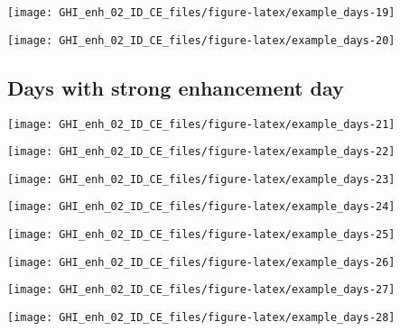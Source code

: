\documentclass[
  10pt,
  a4paper,oneside]{article}
\begin{document}
\begin{center}\texttt{[image: GHI\_enh\_02\_ID\_CE\_files/figure-latex/example\_days-19]} \end{center}

\begin{center}\texttt{[image: GHI\_enh\_02\_ID\_CE\_files/figure-latex/example\_days-20]} \end{center}

\FloatBarrier

\hypertarget{days-with-strong-enhancement-day}{%
\subsection{Days with strong enhancement day}\label{days-with-strong-enhancement-day}}

\begin{center}\texttt{[image: GHI\_enh\_02\_ID\_CE\_files/figure-latex/example\_days-21]} \end{center}

\begin{center}\texttt{[image: GHI\_enh\_02\_ID\_CE\_files/figure-latex/example\_days-22]} \end{center}

\begin{center}\texttt{[image: GHI\_enh\_02\_ID\_CE\_files/figure-latex/example\_days-23]} \end{center}

\begin{center}\texttt{[image: GHI\_enh\_02\_ID\_CE\_files/figure-latex/example\_days-24]} \end{center}

\begin{center}\texttt{[image: GHI\_enh\_02\_ID\_CE\_files/figure-latex/example\_days-25]} \end{center}

\begin{center}\texttt{[image: GHI\_enh\_02\_ID\_CE\_files/figure-latex/example\_days-26]} \end{center}

\begin{center}\texttt{[image: GHI\_enh\_02\_ID\_CE\_files/figure-latex/example\_days-27]} \end{center}

\begin{center}\texttt{[image: GHI\_enh\_02\_ID\_CE\_files/figure-latex/example\_days-28]} \end{center}
\end{document}
